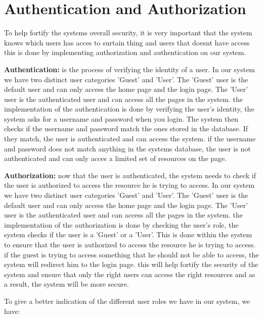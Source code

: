 \section{Authentication and Authorization}

To help fortify the systems overall security, it is very important that the system knows which users has acces to surtain thing and users that doesnt have access this is done by implementing authorization and authentication on our system. \newline

\textbf{Authentication:} is the process of verifying the identity of a user. In our system we have two distinct user categories 'Guest' and 'User'. The 'Guest' user is the default user and can only access the home page and the login page. The 'User' user is the authenticated user and can access all the pages in the system. \newline
the implementation of the authentication is done by verifying the user's identity, the system asks for a username and password when you login. The system then checks if the username and password match the ones stored in the database. If they match, the user is authenticated and can access the system.
if the username and password does not match anything in the systems database, the user is not authenticated and can only acces a limited set of resources on the page. \newline

\textbf{Authorization:} now that the user is authenticated, the system needs to check if the user is authorized to access the resource he is trying to access. In our system we have two distinct user categories 'Guest' and 'User'. The 'Guest' user is the default user and can only access the home page and the login page. The 'User' user is the authenticated user and can access all the pages in the system.
the implementation of the authorization is done by checking the user's role, the system checks if the user is a 'Guest' or a 'User'. This is done within the system to ensure that the user is authorized to access the resource he is trying to access. if the guest is trying to access something that he should not be able to access, the system will redirect him to the login page. 
this will help fortify the security of the system and ensure that only the right users can access the right resources and as a result, the system will be more secure. \newline

To give a better indication of the different user roles we have in our system, we have:

